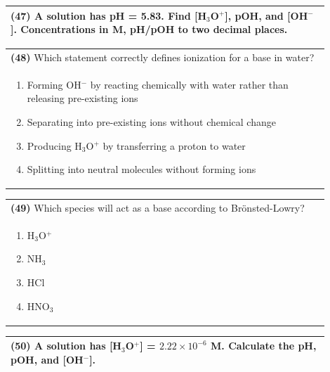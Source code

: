 \documentclass{article}
\begin{document}
\noindent\begin{tabular}{|p{0.9\linewidth}|}
\hline
\textbf{(47)} A solution has pH = 5.83. Find [H$_3$O$^+$], pOH, and [OH$^-$]. Concentrations in M, pH/pOH to two decimal places. \\[4cm]
\hline
\end{tabular}

\noindent\begin{tabular}{|p{0.9\linewidth}|}
\hline
\textbf{(48)} Which statement correctly defines ionization for a base in water? \\[0.2cm]
\begin{minipage}[t]{0.85\linewidth}
\begin{enumerate}[label=\alph*.]
\item Forming OH$^-$ by reacting chemically with water rather than releasing pre-existing ions
\item Separating into pre-existing ions without chemical change
\item Producing H$_3$O$^+$ by transferring a proton to water
\item Splitting into neutral molecules without forming ions
\end{enumerate}
\end{minipage}\\[0.2cm]
\hline
\end{tabular}
\newpage

\noindent\begin{tabular}{|p{0.9\linewidth}|}
\hline
\textbf{(49)} Which species will act as a base according to Brönsted-Lowry? \\[0.2cm]
\begin{minipage}{0.85\linewidth}
\begin{enumerate}[label=\alph*.]
\item H$_3$O$^+$ \item NH$_3$ \item HCl \item HNO$_3$
\end{enumerate}
\end{minipage}\\[0.2cm]
\hline
\end{tabular}

\noindent\begin{tabular}{|p{0.9\linewidth}|}
\hline
\textbf{(50)} A solution has [H$_3$O$^+$] = $2.22\times10^{-6}$ M. Calculate the pH, pOH, and [OH$^-$]. \\[4cm]
\hline
\end{tabular}
\end{document}
